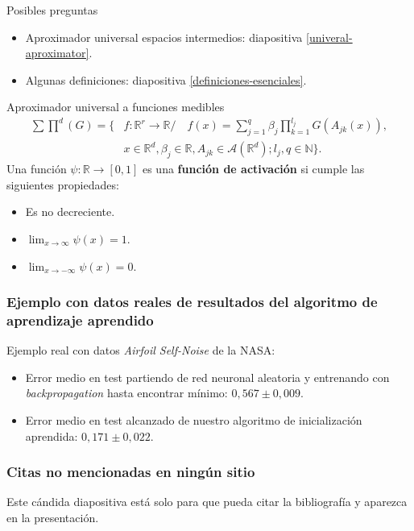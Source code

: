 \documentclass{beamer}
\newcommand{\R}{\mathbb{R}}
\newcommand{\N}{\mathbb{N}}
\newcommand{\afines}{\mathcal{A}(\R^d)}
\begin{document}
\begin{frame}{Posibles preguntas}
    \begin{itemize}
        \item Aproximador universal espacios intermedios: diapositiva \ref{univeral-aproximator}.
        \item Algunas definiciones: diapositiva \ref{definiciones-esenciales}.
    \end{itemize}
    
\end{frame}
\begin{frame}{Aproximador universal a funciones medibles}
    \label{definiciones-esenciales}
    \begin{align*} 
        \sum \prod^d(G) = \{ 
        &f: \R^r \longrightarrow \R / \quad
        f(x) = \sum_{j = 1} ^q  \beta_j \prod_{k=1}^{l_j}
        G(A_{jk}(x)), \\
        &x  \in \R^d, \beta_j \in \R, A_{jk}\in \afines; l_j,q \in \N
        \}.
    \end{align*} 
    Una función  $\psi: \R \longrightarrow [0,1]$ 
    es una \textbf{ función de activación} 
    si  cumple las siguientes propiedades:
    \begin{itemize}
        \item Es no decreciente.
        \item $\lim _{x \rightarrow \infty} \psi(x) = 1$.
        \item $\lim _{x \rightarrow -\infty} \psi(x) = 0$.
    \end{itemize}   
\end{frame}


\begin{frame}
    \frametitle{Ejemplo con datos reales de resultados del algoritmo de aprendizaje aprendido}
    Ejemplo real con datos \textit{Airfoil Self-Noise} de la NASA: 
    \begin{itemize}
        \item Error medio en test partiendo de red neuronal aleatoria y entrenando con \textit{backpropagation} hasta encontrar mínimo: $0,567 \pm 0,009$.
        \item Error medio en test alcanzado de nuestro algoritmo de inicialización aprendida: $0,171 \pm 0,022$.
    \end{itemize}
\end{frame}


\begin{frame}
    \frametitle{Citas no mencionadas en ningún sitio}

    Este cándida diapositiva está solo para que pueda citar la 
    bibliografía y aparezca en la presentación. 
    \cite{MostafaLearningFromData}
    \cite{the-elements-of-real-analysis}

\end{frame}
\end{document}
